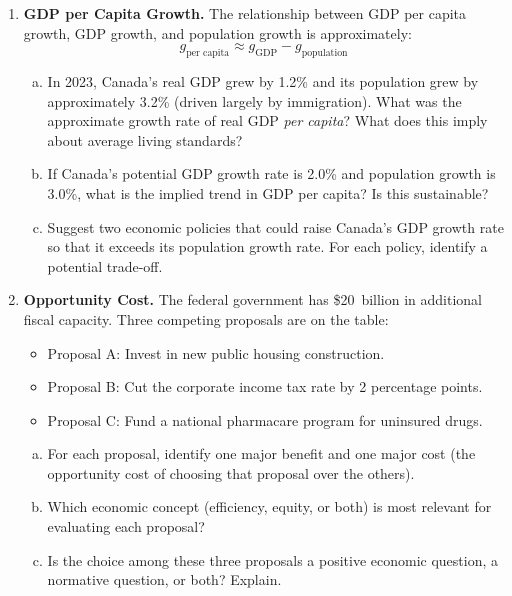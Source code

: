 \begin{enumerate}
\item \textbf{GDP per Capita Growth.} The relationship between GDP per
capita growth, GDP growth, and population growth is approximately:
\[
  g_{\text{per capita}} \approx g_{\text{GDP}} - g_{\text{population}}
\]
\begin{enumerate}[(a)]
  \item In 2023, Canada's real GDP grew by 1.2\% and its population
        grew by approximately 3.2\% (driven largely by immigration).
        What was the approximate growth rate of real GDP \textit{per capita}?
        What does this imply about average living standards?
  \item If Canada's potential GDP growth rate is 2.0\% and population
        growth is 3.0\%, what is the implied trend in GDP per capita?
        Is this sustainable?
  \item Suggest two economic policies that could raise Canada's GDP
        growth rate so that it exceeds its population growth rate.
        For each policy, identify a potential trade-off.
\end{enumerate}

\item \textbf{Opportunity Cost.} The federal government has \$20~billion
in additional fiscal capacity. Three competing proposals are on the table:
\begin{itemize}
  \item Proposal A: Invest in new public housing construction.
  \item Proposal B: Cut the corporate income tax rate by 2 percentage points.
  \item Proposal C: Fund a national pharmacare program for uninsured drugs.
\end{itemize}
\begin{enumerate}[(a)]
  \item For each proposal, identify one major benefit and one major cost
        (the opportunity cost of choosing that proposal over the others).
  \item Which economic concept (efficiency, equity, or both) is most
        relevant for evaluating each proposal?
  \item Is the choice among these three proposals a positive economic
        question, a normative question, or both? Explain.
\end{enumerate}


\end{enumerate}
